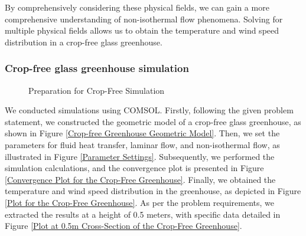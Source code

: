 \documentclass{apmcmthesis}
\begin{document}
{By comprehensively considering these physical fields, we can gain a more comprehensive understanding of non-isothermal flow phenomena. Solving for multiple physical fields allows us to obtain the temperature and wind speed distribution in a crop-free glass greenhouse.

\subsubsection{Crop-free glass greenhouse simulation}


\begin{figure}[htbp]
      \centering
      
      \caption{Preparation for Crop-Free Simulation} %
      \label{Preparation for Crop-Free Simulation}
  \end{figure}

  We conducted simulations using COMSOL. Firstly, following the given problem statement, we constructed the geometric model of a crop-free glass greenhouse, as shown in Figure \ref{Crop-free Greenhouse Geometric Model}. Then, we set the parameters for fluid heat transfer, laminar flow, and non-isothermal flow, as illustrated in Figure \ref{Parameter Settings}. Subsequently, we performed the simulation calculations, and the convergence plot is presented in Figure \ref{Convergence Plot for the Crop-Free Greenhouse}. Finally, we obtained the temperature and wind speed distribution in the greenhouse, as depicted in Figure \ref{Plot for the Crop-Free Greenhouse}. As per the problem requirements, we extracted the results at a height of 0.5 meters, with specific data detailed in Figure \ref{Plot at 0.5m Cross-Section of the Crop-Free Greenhouse}.

}
\end{document}
